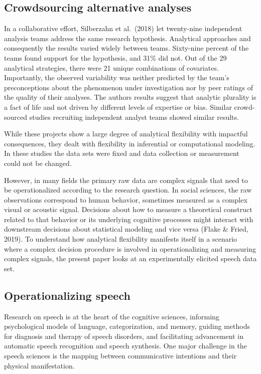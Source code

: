 \documentclass[
  english,
  man,floatsintext]{apa6}
\begin{document}
\hypertarget{crowdsourcing-alternative-analyses}{%
\subsection{Crowdsourcing alternative analyses}\label{crowdsourcing-alternative-analyses}}

In a collaborative effort, Silberzahn et al.~(2018) let twenty-nine independent analysis teams address the same research hypothesis.
Analytical approaches and consequently the results varied widely between teams.
Sixty-nine percent of the teams found support for the hypothesis, and 31\% did not.
Out of the 29 analytical strategies, there were 21 unique combinations of covariates.
Importantly, the observed variability was neither predicted by the team's preconceptions about the phenomenon under investigation nor by peer ratings of the quality of their analyses.
The authors results suggest that analytic plurality is a fact of life and not driven by different levels of expertise or bias.
Similar crowd-sourced studies recruiting independent analyst teams showed similar results.

While these projects show a large degree of analytical flexibility with impactful consequences, they dealt with flexibility in inferential or computational modeling.
In these studies the data sets were fixed and data collection or measurement could not be changed.

However, in many fields the primary raw data are complex signals that need to be operationalized according to the research question.
In social sciences, the raw observations correspond to human behavior, sometimes measured as a complex visual or acoustic signal.
Decisions about how to measure a theoretical construct related to that behavior or its underlying cognitive processes might interact with downstream decisions about statistical modeling and vice versa (Flake \& Fried, 2019).
To understand how analytical flexibility manifests itself in a scenario where a complex decision procedure is involved in operationalizing and measuring complex signals, the present paper looks at an experimentally elicited speech data set.

\hypertarget{operationalizing-speech}{%
\subsection{Operationalizing speech}\label{operationalizing-speech}}

Research on speech is at the heart of the cognitive sciences, informing psychological models of language, categorization, and memory, guiding methods for diagnosis and therapy of speech disorders, and facilitating advancement in automatic speech recognition and speech synthesis. One major challenge in the speech sciences is the mapping between communicative intentions and their physical manifestation.
\end{document}
